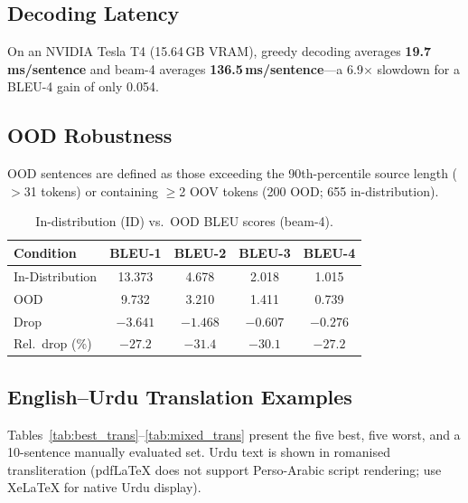 \documentclass[runningheads]{llncs}
\begin{document}
\subsection{Decoding Latency}

On an NVIDIA Tesla T4 (15.64\,GB VRAM), greedy decoding averages
\textbf{19.7\,ms/sentence} and beam-4 averages \textbf{136.5\,ms/sentence}---a
6.9$\times$ slowdown for a BLEU-4 gain of only 0.054.

\subsection{OOD Robustness}

OOD sentences are defined as those exceeding the 90th-percentile source length
($>$31 tokens) or containing $\geq$2 OOV tokens (200 OOD; 655 in-distribution).

\begin{table}[t]
\centering
\caption{In-distribution (ID) vs.\ OOD BLEU scores (beam-4).}
\label{tab:ood}
\begin{tabular}{lcccc}
\toprule
\textbf{Condition} & \textbf{BLEU-1} & \textbf{BLEU-2} & \textbf{BLEU-3} & \textbf{BLEU-4} \\
\midrule
In-Distribution & 13.373 & 4.678 & 2.018 & 1.015 \\
OOD             &  9.732 & 3.210 & 1.411 & 0.739 \\
\midrule
Drop            & $-3.641$ & $-1.468$ & $-0.607$ & $-0.276$ \\
Rel.\ drop (\%) & $-27.2$  & $-31.4$  & $-30.1$  & $-27.2$  \\
\bottomrule
\end{tabular}
\end{table}

\subsection{English--Urdu Translation Examples}

Tables~\ref{tab:best_trans}--\ref{tab:mixed_trans} present the five best,
five worst, and a 10-sentence manually evaluated set. Urdu text is shown
in romanised transliteration (pdfLaTeX does not support Perso-Arabic script
rendering; use XeLaTeX for native Urdu display).
\end{document}
